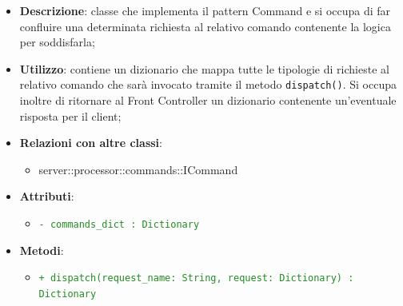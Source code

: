    \begin{itemize}
      \item \textbf{Descrizione}: classe che implementa il pattern Command e si occupa di far confluire una determinata richiesta al relativo comando contenente la logica per soddisfarla;
      \item \textbf{Utilizzo}: contiene un dizionario che mappa tutte le tipologie di richieste al relativo comando che sarà invocato tramite il metodo \texttt{dispatch()}. Si occupa inoltre di ritornare al Front Controller un dizionario contenente un'eventuale risposta per il client;
      \item \textbf{Relazioni con altre classi}:
        \begin{itemize}
          \item server::processor::commands::ICommand
        \end{itemize}
    \item \textbf{Attributi}:
          \begin{itemize}
              \item \textcolor{forestgreen}{\texttt{- commands\_dict : Dictionary}}
          \end{itemize}
    \item \textbf{Metodi}:
          \begin{itemize}
              \item \textcolor{forestgreen}{\texttt{+ dispatch(request\_name: String, request: Dictionary) : Dictionary}}
          \end{itemize}
      \end{itemize}



